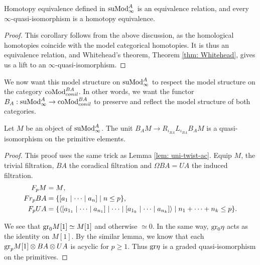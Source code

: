\documentclass[../thesis.tex]{subfiles}
\begin{document}
            \begin{corollary}
                Homotopy equivalence defined in $\tt{suMod}_\infty^A$ is an equivalence relation, and every $\infty$-quasi-isomorphism is a homotopy equivalence.
            \end{corollary}

            \begin{proof}
                This corollary follows from the above discussion, as the homological homotopies coincide with the model categorical homotopies. It is thus an equivalence relation, and Whitehead's theorem, Theorem \ref{thm: Whitehead}, gives us a lift to an $\infty$-quasi-isomorphism.
            \end{proof}

            We now want this model structure on $\tt{suMod}^A_\infty$ to respect the model structure on the category $\tt{coMod}_{conil}^{BA}$. In other words, we want the functor $B_A: \tt{suMod}_\infty^A \to \tt{coMod}_{conil}^{BA}$ to preserve and reflect the model structure of both categories.

            \begin{lemma}
                Let $M$ be an object of $\tt{suMod}_\infty^A$. The unit $B_AM \to R_{\iota_{BA}}L_{\iota_{BA}}B_AM$ is a quasi-isomorphism on the primitive elements.
            \end{lemma}

            \begin{proof}
                This proof uses the same trick as Lemma \ref{lem: uni-twist-ac}. Equip $M$, the trivial filtration, $BA$ the coradical filtration and $\Omega BA = UA$ the induced filtration.
                \begin{align*}
                    F_pM & = M\tt{,} \\
                    Fr_pBA & = \startset{[a_1 \mid \cdots \mid a_n] \mid n \leq p}\tt{,} \\
                    F_p UA & = \startset{\langle [a_{1_1} \mid \cdots \mid a_{n_1}] \mid \cdots \mid [a_{1_k} \mid \cdots \mid a_{n_k}] \rangle \mid n_1 + \cdots + n_k \leq p}\tt{.}
                \end{align*} 

                We see that $\tt{gr}_0M[1] \simeq M[1]$ and otherwise $\simeq 0$. In the same way, $\tt{gr}_0\eta$ acts as the identity on $M[1]$. By the similar lemma, we know that each $\tt{gr}_p M[1] \otimes BA \otimes UA$ is acyclic for $p \geq 1$. Thus $\tt{gr}\eta$ is a graded quasi-isomorphism on the primitives.

            \end{proof}
\end{document}
